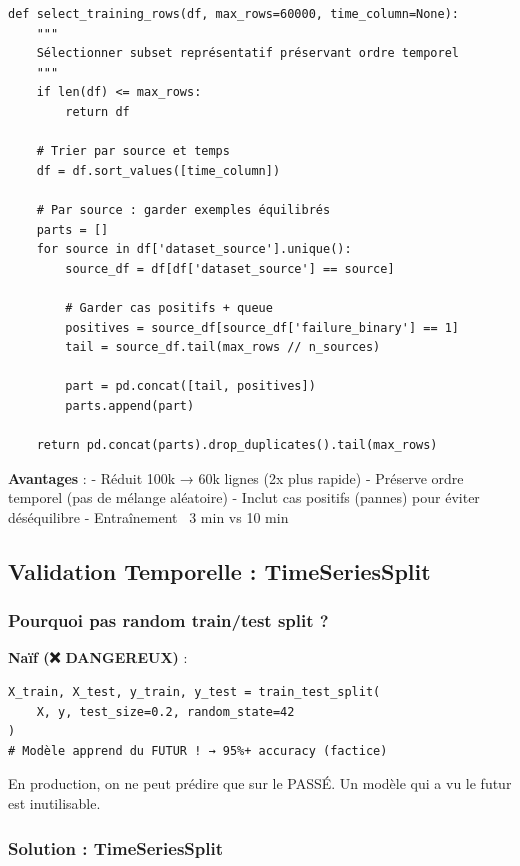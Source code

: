 \documentclass[12pt,a4paper,french]{article}
\begin{document}
\begin{lstlisting}
def select_training_rows(df, max_rows=60000, time_column=None):
    """
    Sélectionner subset représentatif préservant ordre temporel
    """
    if len(df) <= max_rows:
        return df
    
    # Trier par source et temps
    df = df.sort_values([time_column])
    
    # Par source : garder exemples équilibrés
    parts = []
    for source in df['dataset_source'].unique():
        source_df = df[df['dataset_source'] == source]
        
        # Garder cas positifs + queue
        positives = source_df[source_df['failure_binary'] == 1]
        tail = source_df.tail(max_rows // n_sources)
        
        part = pd.concat([tail, positives])
        parts.append(part)
    
    return pd.concat(parts).drop_duplicates().tail(max_rows)
\end{lstlisting}

\textbf{Avantages} :
- Réduit 100k → 60k lignes (2x plus rapide)
- Préserve ordre temporel (pas de mélange aléatoire)
- Inclut cas positifs (pannes) pour éviter déséquilibre
- Entraînement ~3 min vs 10 min

\subsection{Validation Temporelle : TimeSeriesSplit}

\subsubsection{Pourquoi pas random train/test split ?}

\textbf{Naïf (❌ DANGEREUX)} :
\begin{lstlisting}
X_train, X_test, y_train, y_test = train_test_split(
    X, y, test_size=0.2, random_state=42
)
# Modèle apprend du FUTUR ! → 95%+ accuracy (factice)
\end{lstlisting}

En production, on ne peut prédire que sur le PASSÉ. Un modèle qui a vu le futur est inutilisable.

\subsubsection{Solution : TimeSeriesSplit}
\end{document}
